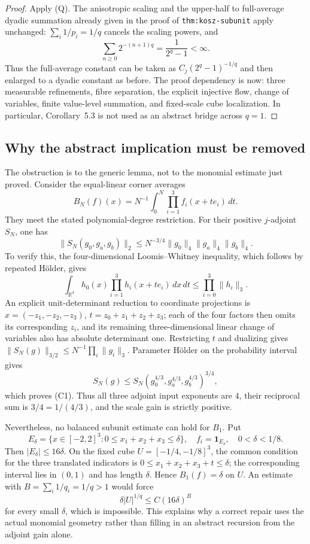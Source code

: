 \documentclass[11pt]{article}
\begin{document}
\begin{proof}
Apply (Q). The anisotropic scaling and the upper-half to full-average
dyadic summation already given in the proof of
\texttt{thm:kosz-subunit} apply unchanged: $\sum_i1/p_i=1/q$ cancels the
scaling powers, and
\[
 \sum_{n\geq0}2^{-(n+1)q}=\frac1{2^q-1}<\infty.
\]
Thus the full-average constant can be taken as
$C_j(2^q-1)^{-1/q}$ and then enlarged to a dyadic constant as before.
The proof dependency is now: three measurable refinements, fibre
separation, the explicit injective flow, change of variables, finite
value-level summation, and fixed-scale cube localization. In particular,
Corollary~5.3 is not used as an abstract bridge across $q=1$.
\end{proof}

\subsection*{Why the abstract implication must be removed}
The obstruction is to the generic lemma, not to the monomial estimate just
proved. Consider the equal-linear corner averages
\[
 B_N(f)(x)=N^{-1}\int_0^N\prod_{i=1}^3 f_i(x+t e_i)\,dt.
\]
They meet the stated polynomial-degree restriction. For their positive
$j$-adjoint $S_N$, one has
\[
 \|S_N(g_0,g_a,g_b)\|_2\leq N^{-3/4}
        \|g_0\|_4\|g_a\|_4\|g_b\|_4.             \tag{C1}
\]
To verify this, the four-dimensional Loomis--Whitney inequality, which
follows by repeated H\"older, gives
\[
 \int_{\mathbb R^4}h_0(x)\prod_{i=1}^3 h_i(x+t e_i)\,dx\,dt
 \leq\prod_{i=0}^3\|h_i\|_3.
\]
An explicit unit-determinant reduction to coordinate projections is
$x=(-z_1,-z_2,-z_3)$, $t=z_0+z_1+z_2+z_3$; each of the four factors then
omits its corresponding $z_i$, and its remaining three-dimensional linear
change of variables also has absolute determinant one. Restricting $t$
and dualizing gives
$\|S_N(g)\|_{3/2}\leq N^{-1}\prod_i\|g_i\|_3$.
Parameter H\"older on the probability interval gives
\[
 S_N(g)\leq S_N(g_0^{4/3},g_a^{4/3},g_b^{4/3})^{3/4},
\]
which proves (C1). Thus all three adjoint input exponents are $4$, their
reciprocal sum is $3/4=1/(4/3)$, and the scale gain is strictly positive.

Nevertheless, no balanced subunit estimate can hold for $B_1$. Put
\[
 E_\delta=\{x\in[-2,2]^3:0\leq x_1+x_2+x_3\leq\delta\},
 \quad f_i=\mathbf1_{E_\delta},\quad 0<\delta<1/8.
\]
Then $|E_\delta|\leq16\delta$. On the fixed cube
$U=[-1/4,-1/8]^3$, the common condition for the three translated indicators
is $0\leq x_1+x_2+x_3+t\leq\delta$; the corresponding interval lies in
$(0,1)$ and has length $\delta$. Hence $B_1(f)=\delta$ on $U$.
An estimate with $B=\sum_i1/q_i=1/q>1$ would force
\[
 \delta |U|^{1/q}\leq C(16\delta)^B
\]
for every small $\delta$, which is impossible. This explains why a correct
repair uses the actual monomial geometry rather than filling in an
abstract recursion from the adjoint gain alone.
\end{document}

